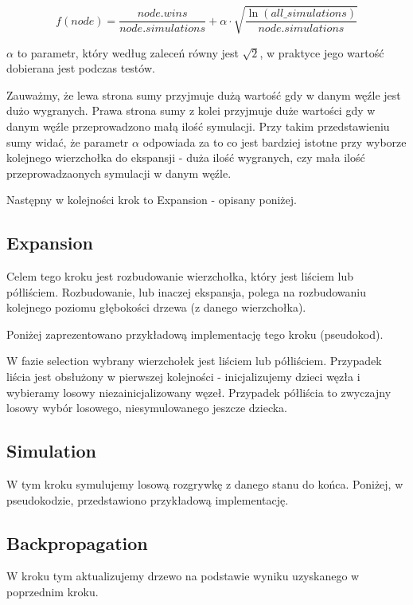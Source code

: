 \documentclass[polish,shortabstract,inz]{iithesis}
\begin{document}
\[ f\left(node\right) = \frac{node.wins}{node.simulations} + \alpha \cdot \sqrt{\frac{\ln{\left(all\_simulations\right)}}{node.simulations}} \]

\( \alpha \) to parametr, który według zaleceń równy jest \( \sqrt{2} \), w praktyce jego wartość dobierana jest podczas testów.

Zauważmy, że lewa strona sumy przyjmuje dużą wartość gdy w danym węźle jest dużo wygranych.
Prawa strona sumy z kolei przyjmuje duże wartości gdy w danym węźle przeprowadzono małą ilość symulacji.
Przy takim przedstawieniu sumy widać, że parametr \( \alpha \) odpowiada za to co jest bardziej istotne przy wyborze kolejnego wierzchołka do ekspansji - duża ilość wygranych, czy mała ilość przeprowadzaonych symulacji w danym węźle.

Następny w kolejności krok to Expansion - opisany poniżej.

\subsection{Expansion}
Celem tego kroku jest rozbudowanie wierzchołka, który jest liściem lub półliściem.
Rozbudowanie, lub inaczej ekspansja, polega na rozbudowaniu kolejnego poziomu głębokości drzewa (z danego wierzchołka).

Poniżej zaprezentowano przykładową implementację tego kroku (pseudokod).



W fazie selection wybrany wierzchołek jest liściem lub półliściem.
Przypadek liścia jest obsłużony w pierwszej kolejności - inicjalizujemy dzieci węzła i wybieramy losowy niezainicjalizowany węzeł.
Przypadek półliścia to zwyczajny losowy wybór losowego, niesymulowanego jeszcze dziecka.

\subsection{Simulation}
W tym kroku symulujemy losową rozgrywkę z danego stanu do końca.
Poniżej, w pseudokodzie, przedstawiono przykładową implementację.



\subsection{Backpropagation}
W kroku tym aktualizujemy drzewo na podstawie wyniku uzyskanego w poprzednim kroku.
\end{document}
